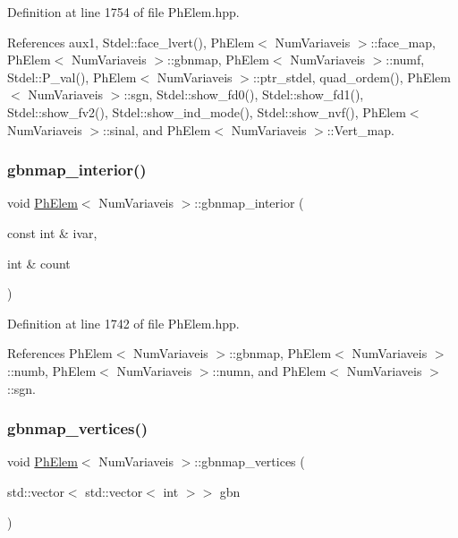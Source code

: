 Definition at line 1754 of file Ph\+Elem.\+hpp.



References aux1, Stdel\+::face\+\_\+lvert(), Ph\+Elem$<$ Num\+Variaveis $>$\+::face\+\_\+map, Ph\+Elem$<$ Num\+Variaveis $>$\+::gbnmap, Ph\+Elem$<$ Num\+Variaveis $>$\+::numf, Stdel\+::\+P\+\_\+val(), Ph\+Elem$<$ Num\+Variaveis $>$\+::ptr\+\_\+stdel, quad\+\_\+ordem(), Ph\+Elem$<$ Num\+Variaveis $>$\+::sgn, Stdel\+::show\+\_\+fd0(), Stdel\+::show\+\_\+fd1(), Stdel\+::show\+\_\+fv2(), Stdel\+::show\+\_\+ind\+\_\+mode(), Stdel\+::show\+\_\+nvf(), Ph\+Elem$<$ Num\+Variaveis $>$\+::sinal, and Ph\+Elem$<$ Num\+Variaveis $>$\+::\+Vert\+\_\+map.

\mbox{\label{classPhElem_ae6f35113c182e2678646552e6c4a752c}} 
\subsubsection{\texorpdfstring{gbnmap\+\_\+interior()}{gbnmap\_interior()}}
{\footnotesize\ttfamily void \hyperlink{classPhElem}{Ph\+Elem}$<$ Num\+Variaveis $>$\+::gbnmap\+\_\+interior (\begin{DoxyParamCaption}\item[{const int \&}]{ivar,  }\item[{int \&}]{count }\end{DoxyParamCaption})\hspace{0.3cm}{\ttfamily [inherited]}}



Definition at line 1742 of file Ph\+Elem.\+hpp.



References Ph\+Elem$<$ Num\+Variaveis $>$\+::gbnmap, Ph\+Elem$<$ Num\+Variaveis $>$\+::numb, Ph\+Elem$<$ Num\+Variaveis $>$\+::numn, and Ph\+Elem$<$ Num\+Variaveis $>$\+::sgn.

\mbox{\label{classPhElem_ad8d5bac3d1866cfe20daec73fc405b05}} 
\subsubsection{\texorpdfstring{gbnmap\+\_\+vertices()}{gbnmap\_vertices()}\hspace{0.1cm}{\footnotesize\ttfamily [1/2]}}
{\footnotesize\ttfamily void \hyperlink{classPhElem}{Ph\+Elem}$<$ Num\+Variaveis $>$\+::gbnmap\+\_\+vertices (\begin{DoxyParamCaption}\item[{std\+::vector$<$ std\+::vector$<$ int $>$$>$}]{gbn }\end{DoxyParamCaption})\hspace{0.3cm}{\ttfamily [inherited]}}



